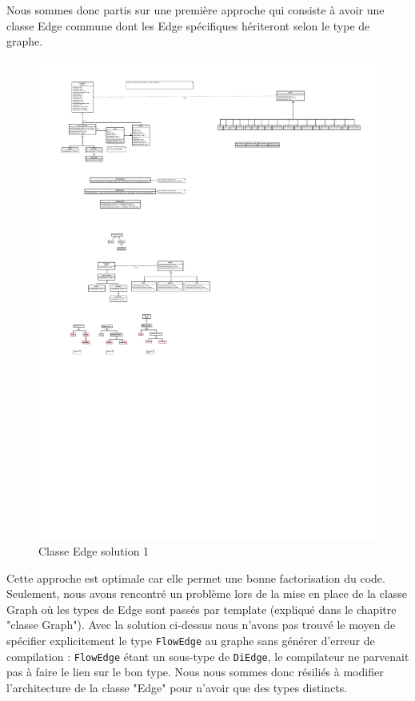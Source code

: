 \documentclass[french]{article}
\begin{document}
			Nous sommes donc partis sur une première approche qui consiste à avoir une classe Edge commune dont les Edge spécifiques hériteront selon le type de graphe.
			\begin{figure}[H]
				\centering
				\includegraphics[scale=4.0]{Conception/graph/classedgesol1.pdf}
				\caption{Classe Edge solution 1}
			\end{figure}
			Cette approche est optimale car elle permet une bonne factorisation du code. Seulement, nous avons rencontré un problème lors de la mise en place de la classe Graph où les types de Edge sont passés par template (expliqué dans le chapitre "classe Graph"). Avec la solution ci-dessus nous n'avons pas trouvé le moyen de spécifier explicitement le type \lstinline[basicstyle=\ttfamily\color{blue}]|FlowEdge| au graphe sans générer d'erreur de compilation : \lstinline[basicstyle=\ttfamily\color{blue}]|FlowEdge| étant un sous-type de \lstinline[basicstyle=\ttfamily\color{blue}]|DiEdge|, le compilateur ne parvenait pas à faire le lien sur le bon type. Nous nous sommes donc résiliés à modifier l'architecture de la classe "Edge" pour n'avoir que des types distincts.
\end{document}
